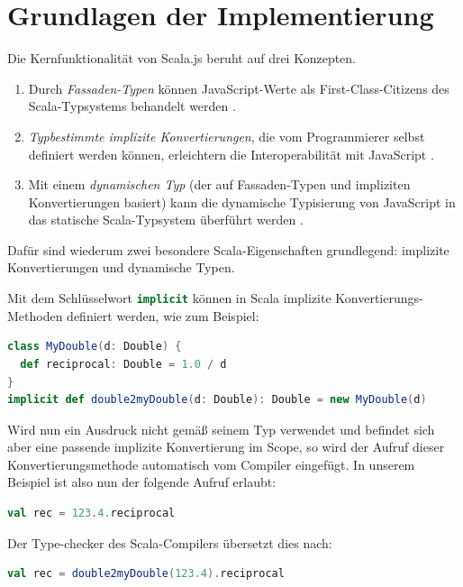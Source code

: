 \documentclass[a4paper, 12pt, hidelinks, listof=totoc, listoftables=totoc, bibliography=totoc]{scrreprt}
\newcommand{\scala}[1]{\lstinline[language=Scala, style=inline]|#1|}
\begin{document}
\section{Grundlagen der Implementierung}

Die Kernfunktionalität von Scala.js beruht auf drei Konzepten.
\begin{enumerate}
	\item Durch \emph{Fassaden-Typen} können JavaScript-Werte als First-Class-Citizens des Scala-Typsystems behandelt werden \cite[S. 4]{doeraene2013.TDI}.
	\item \emph{Typbestimmte implizite Konvertierungen}, die vom Programmierer selbst definiert werden können, erleichtern die Interoperabilität mit JavaScript \cite[S. 5]{doeraene2013.TDI}.
	\item Mit einem \emph{dynamischen Typ} (der auf Fassaden-Typen und impliziten Konvertierungen basiert) kann die dynamische Typisierung von JavaScript in das statische Scala-Typsystem überführt werden \cite[S. 6]{doeraene2013.TDI}.
\end{enumerate}

Dafür sind wiederum zwei besondere Scala-Eigenschaften grundlegend: implizite Konvertierungen und dynamische Typen.

Mit dem Schlüsselwort \scala{implicit} können in Scala implizite Konvertierungs-Methoden definiert werden, wie zum Beispiel:
\begin{lstlisting}[language=Scala, style=snippet]
class MyDouble(d: Double) {
  def reciprocal: Double = 1.0 / d
}
implicit def double2myDouble(d: Double): Double = new MyDouble(d)
\end{lstlisting}

Wird nun ein Ausdruck nicht gemäß seinem Typ verwendet und befindet sich aber eine passende implizite Konvertierung im Scope, so wird der Aufruf dieser Konvertierungsmethode automatisch vom Compiler eingefügt. In unserem Beispiel ist also nun der folgende Aufruf erlaubt:

\begin{lstlisting}[language=Scala, style=snippet]
val rec = 123.4.reciprocal
\end{lstlisting}

Der Type-checker des Scala-Compilers übersetzt dies nach:

\begin{lstlisting}[language=Scala, style=snippet]
val rec = double2myDouble(123.4).reciprocal
\end{lstlisting}
\end{document}
